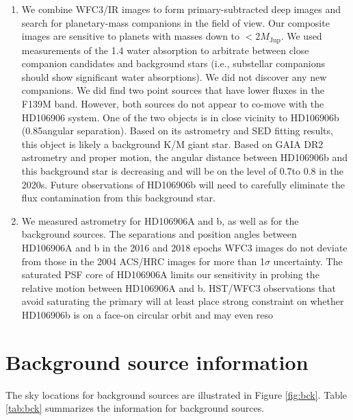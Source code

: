 \documentclass[twocolumn, trackchanges]{aastex62}
\newcommand{\mjup}{\ensuremath{M_\mathrm{Jup}}\xspace}
\begin{document}
\begin{enumerate}
\item We combine WFC3/IR images to form primary-subtracted deep images and search for planetary-mass companions in the field of view. Our composite images are sensitive to planets with masses down to $< 2 \mjup$. We used measurements of the 1.4\micron{} water absorption to {arbitrate between close companion candidates and background stars} (i.e., substellar companions should show significant water absorptions). We did not discover  any new companions. We did find two point sources that have lower fluxes in the F139M band. However, both sources do not appear to co-move with the HD106906 system. One of the two objects is in close vicinity to HD106906b (0.85\arcsec angular separation). Based on its astrometry and SED fitting results, this object is likely a background K/M giant star.  Based on GAIA DR2 astrometry and proper motion, the angular distance between HD106906b and this background star is decreasing and will be on the level of 0.7\arcsec to 0.8\arcsec{}  in the 2020s. Future observations of HD106906b will need to  carefully eliminate the flux contamination from this background star.

\item We measured astrometry for HD106906A and b, as well as for the background sources. The separations and position angles between HD106906A and b in the 2016 and 2018 epochs WFC3 images do not deviate from  those in the 2004 ACS/HRC images for more than 1$\sigma$ uncertainty. The saturated PSF core of  HD106906A limits our sensitivity in probing the relative motion between HD106906A and b. HST/WFC3 observations that avoid saturating the primary will at least place strong constraint on whether HD106906b is on a face-on circular orbit and may even reso
\end{enumerate}





\appendix
\section{Background source information}

The sky locations for background sources are illustrated in Figure \ref{fig:bck}. Table \ref{tab:bck} summarizes the information for background sources.
\end{document}
